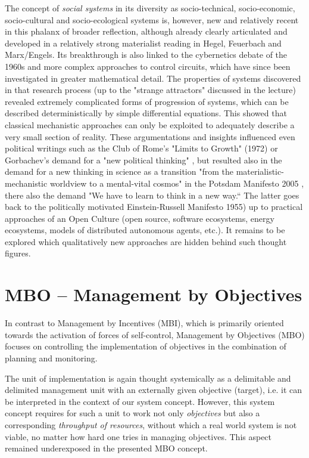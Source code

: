 \documentclass[11pt,a4paper]{article}
\begin{document}
The concept of \emph{social systems} in its diversity as socio-technical,
socio-economic, socio-cultural and socio-ecological systems is, however, new
and relatively recent in this phalanx of broader reflection, although already
clearly articulated and developed in a relatively strong materialist reading
in Hegel, Feuerbach and Marx/Engels. Its breakthrough is also linked to the
cybernetics debate of the 1960s and more complex approaches to control
circuits, which have since been investigated in greater mathematical detail.
The properties of systems discovered in that research process (up to the
"strange attractors" discussed in the lecture) revealed extremely complicated
forms of progression of systems, which can be described deterministically by
simple differential equations. This showed that classical mechanistic
approaches can only be exploited to adequately describe a very small section
of reality. These argumentations and insights influenced even political
writings such as the Club of Rome's "Limits to Growth" (1972) or Gorbachev's
demand for a "new political thinking" \cite{Gorbachev1987}, but resulted also
in the demand for a new thinking in science as a transition "from the
materialistic-mechanistic worldview to a mental-vital cosmos" in the Potsdam
Manifesto 2005 \cite{PotsdamManifesto2005}, there also the demand "We have to
learn to think in a new way.“ The latter goes back to the politically
motivated Einstein-Russell Manifesto 1955) up to practical approaches of an
Open Culture (open source, software ecosystems, energy ecosystems, models of
distributed autonomous agents, etc.). It remains to be explored which
qualitatively new approaches are hidden behind such thought figures.

\section{MBO – Management by Objectives}

In contrast to Management by Incentives (MBI), which is primarily oriented
towards the activation of forces of self-control, Management by Objectives
(MBO) focuses on controlling the implementation of objectives in the
combination of planning and monitoring.

The unit of implementation is again thought systemically as a delimitable and
delimited management unit with an externally given objective (target), i.e. it
can be interpreted in the context of our system concept. However, this system
concept requires for such a unit to work not only \emph{objectives} but also a
corresponding \emph{throughput of resources}, without which a real world
system is not viable, no matter how hard one tries in managing objectives.
This aspect remained underexposed in the presented MBO concept.
\end{document}
